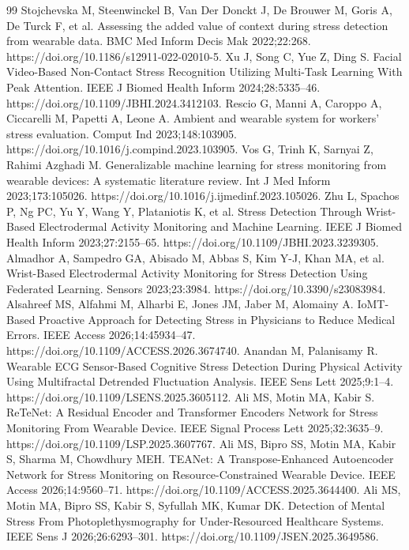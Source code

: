 \documentclass[11pt,a4paper]{article}
\begin{document}
\begin{thebibliography}{99}
 Stojchevska M, Steenwinckel B, Van Der Donckt J, De Brouwer M, Goris A, De Turck F, et al. Assessing the added value of context during stress detection from wearable data. BMC Med Inform Decis Mak 2022;22:268. https://doi.org/10.1186/s12911-022-02010-5.
 Xu J, Song C, Yue Z, Ding S. Facial Video-Based Non-Contact Stress Recognition Utilizing Multi-Task Learning With Peak Attention. IEEE J Biomed Health Inform 2024;28:5335--46. https://doi.org/10.1109/JBHI.2024.3412103.
 Rescio G, Manni A, Caroppo A, Ciccarelli M, Papetti A, Leone A. Ambient and wearable system for workers’ stress evaluation. Comput Ind 2023;148:103905. https://doi.org/10.1016/j.compind.2023.103905.
 Vos G, Trinh K, Sarnyai Z, Rahimi Azghadi M. Generalizable machine learning for stress monitoring from wearable devices: A systematic literature review. Int J Med Inform 2023;173:105026. https://doi.org/10.1016/j.ijmedinf.2023.105026.
 Zhu L, Spachos P, Ng PC, Yu Y, Wang Y, Plataniotis K, et al. Stress Detection Through Wrist-Based Electrodermal Activity Monitoring and Machine Learning. IEEE J Biomed Health Inform 2023;27:2155--65. https://doi.org/10.1109/JBHI.2023.3239305.
 Almadhor A, Sampedro GA, Abisado M, Abbas S, Kim Y-J, Khan MA, et al. Wrist-Based Electrodermal Activity Monitoring for Stress Detection Using Federated Learning. Sensors 2023;23:3984. https://doi.org/10.3390/s23083984.
 Alsahreef MS, Alfahmi M, Alharbi E, Jones JM, Jaber M, Alomainy A. IoMT-Based Proactive Approach for Detecting Stress in Physicians to Reduce Medical Errors. IEEE Access 2026;14:45934--47. https://doi.org/10.1109/ACCESS.2026.3674740.
 Anandan M, Palanisamy R. Wearable ECG Sensor-Based Cognitive Stress Detection During Physical Activity Using Multifractal Detrended Fluctuation Analysis. IEEE Sens Lett 2025;9:1--4. https://doi.org/10.1109/LSENS.2025.3605112.
 Ali MS, Motin MA, Kabir S. ReTeNet: A Residual Encoder and Transformer Encoders Network for Stress Monitoring From Wearable Device. IEEE Signal Process Lett 2025;32:3635--9. https://doi.org/10.1109/LSP.2025.3607767.
 Ali MS, Bipro SS, Motin MA, Kabir S, Sharma M, Chowdhury MEH. TEANet: A Transpose-Enhanced Autoencoder Network for Stress Monitoring on Resource-Constrained Wearable Device. IEEE Access 2026;14:9560--71. https://doi.org/10.1109/ACCESS.2025.3644400.
 Ali MS, Motin MA, Bipro SS, Kabir S, Syfullah MK, Kumar DK. Detection of Mental Stress From Photoplethysmography for Under-Resourced Healthcare Systems. IEEE Sens J 2026;26:6293--301. https://doi.org/10.1109/JSEN.2025.3649586.

\end{thebibliography}
\end{document}
